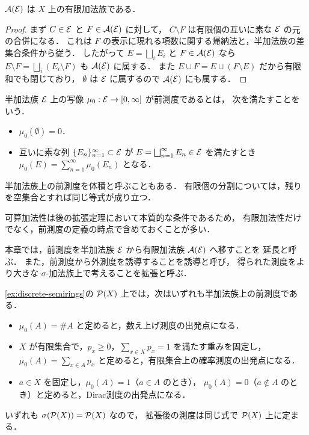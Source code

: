 \begin{theorem}\label{thm:algebra-generated-by-semiring}
$\mathcal A(\mathcal E)$ は $X$ 上の有限加法族である．
\end{theorem}
\begin{proof}
まず $C\in\mathcal E$ と $F\in\mathcal A(\mathcal E)$ に対して，
$C\setminus F$ は有限個の互いに素な $\mathcal E$ の元の合併になる．
これは $F$ の表示に現れる項数に関する帰納法と，半加法族の差集合条件から従う．
したがって $E=\bigsqcup_i E_i$ と $F\in\mathcal A(\mathcal E)$ なら
$E\setminus F=\bigsqcup_i(E_i\setminus F)$ も $\mathcal A(\mathcal E)$ に属する．
また $E\cup F=E\sqcup(F\setminus E)$ だから有限和でも閉じており，
$\emptyset$ は $\mathcal E$ に属するので $\mathcal A(\mathcal E)$ にも属する．
\end{proof}

\begin{definition}[半加法族上の前測度]\label{def:premeasure-on-semiring}
半加法族 $\mathcal E$ 上の写像 $\mu_0:\mathcal E\to[0,\infty]$ が前測度であるとは，
次を満たすことをいう．
\begin{itemize}
    \item $\mu_0(\emptyset)=0$．
    \item 互いに素な列 $\{E_n\}_{n=1}^{\infty}\subset\mathcal E$ が
    $E=\bigsqcup_{n=1}^{\infty}E_n\in\mathcal E$ を満たすとき
    $\mu_0(E)=\sum_{n=1}^{\infty}\mu_0(E_n)$ となる．
\end{itemize}
半加法族上の前測度を体積と呼ぶこともある．
有限個の分割については，残りを空集合とすれば同じ等式が成り立つ．
\end{definition}

\begin{remark}
可算加法性は後の拡張定理において本質的な条件であるため，
有限加法性だけでなく，前測度の定義の時点で含めておくことが多い．
\end{remark}

\begin{remark}[用語の使い分け]
本章では，前測度を半加法族 $\mathcal E$ から有限加法族 $\mathcal A(\mathcal E)$ へ移すことを
延長と呼ぶ．
また，前測度から外測度を誘導することを誘導と呼び，
得られた測度をより大きな $\sigma$-加法族上で考えることを拡張と呼ぶ．
\end{remark}

\begin{example}[離散的な前測度]\label{ex:discrete-premeasures}
\cref{ex:discrete-semirings}の $\mathcal P(X)$ 上では，次はいずれも半加法族上の前測度である．
\begin{itemize}
    \item $\mu_0(A)=\#A$ と定めると，数え上げ測度の出発点になる．
    \item $X$ が有限集合で，$p_x\ge 0$，$\sum_{x\in X}p_x=1$ を満たす重みを固定し，
    $\mu_0(A)=\sum_{x\in A}p_x$ と定めると，有限集合上の確率測度の出発点になる．
    \item $a\in X$ を固定し，$\mu_0(A)=1$（$a\in A$ のとき），
    $\mu_0(A)=0$（$a\notin A$ のとき）と定めると，Dirac測度の出発点になる．
\end{itemize}
いずれも $\sigma(\mathcal P(X))=\mathcal P(X)$ なので，
拡張後の測度は同じ式で $\mathcal P(X)$ 上に定まる．
\end{example}

